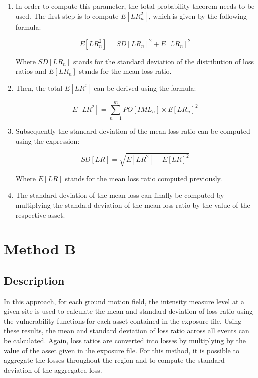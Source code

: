 \begin{enumerate}
\item In order to compute this parameter, the total probability theorem needs to be used. The first step is to compute $E[LR_n^2]$, which is given by the following formula:

\begin{equation}
E[LR_n^2]=SD[LR_n]^2+E[LR_n]^2
\end{equation}

Where $SD[LR_n]$ stands for the standard deviation of the distribution of loss ratios and $E[LR_n]$ stands for the mean loss ratio.

\item Then, the total $E[LR^2]$ can be derived using the formula:

\begin{equation}
E[LR^2]=\sum_{n=1}^mPO[IML_n] \times E[LR_n]^2
\end{equation}

\item Subsequently the standard deviation of the mean loss ratio can be computed using the expression:

\begin{equation}
SD[LR]=\sqrt{E[LR^2]-E[LR]^2}
\end{equation}

Where $E[LR]$ stands for the mean loss ratio computed previously.

\item The standard deviation of the mean loss can finally be computed by multiplying the standard deviation of the mean loss ratio by the value of the respective asset.

\end{enumerate}

\section{Method B}
\subsection{Description}
In this approach, for each ground motion field, the intensity measure level at a given site is used to calculate the mean  and standard deviation of loss ratio using the vulnerability functions for each asset contained in the exposure file. Using these results, the mean and standard deviation of loss ratio across all events can be calculated. Again, loss ratios are converted into losses by multiplying by the value of the asset given in the exposure file. For this method, it is possible to aggregate the losses throughout the region and to compute the standard deviation of the aggregated loss. 


